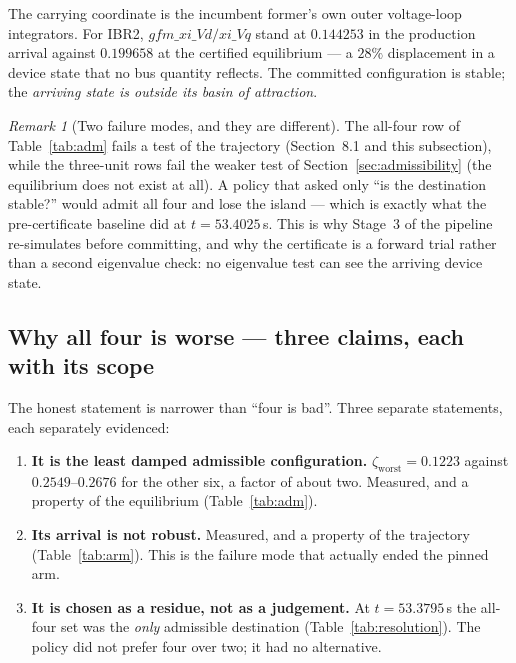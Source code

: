\documentclass[12pt,a4paper]{article}
\theoremstyle{remark}
\newtheorem{remark}{Remark}
\newcommand{\zworst}{\zeta_{\mathrm{worst}}}
\begin{document}
The carrying coordinate is the incumbent former's own outer voltage-loop
integrators. For IBR2, $gfm\_xi\_Vd/xi\_Vq$ stand at $0.144253$ in the production
arrival against $0.199658$ at the certified equilibrium --- a $28\%$ displacement
in a device state that no bus quantity reflects. The committed configuration is
stable; the \emph{arriving state is outside its basin of attraction}.

\begin{remark}[Two failure modes, and they are different]
The all-four row of Table~\ref{tab:adm} fails a test of the trajectory
(Section~8.1 and this subsection), while the three-unit rows fail the weaker test
of Section~\ref{sec:admissibility} (the equilibrium does not exist at all). A
policy that asked only ``is the destination stable?'' would admit all four and
lose the island --- which is exactly what the pre-certificate baseline did at
$t = 53.4025$\,s. This is why Stage~3 of the pipeline re-simulates before
committing, and why the certificate is a forward trial rather than a second
eigenvalue check: no eigenvalue test can see the arriving device state.
\end{remark}

\subsection{Why all four is worse --- three claims, each with its scope}

The honest statement is narrower than ``four is bad''. Three separate
statements, each separately evidenced:

\begin{enumerate}[leftmargin=1.7em,itemsep=3pt]
\item \textbf{It is the least damped admissible configuration.}
      $\zworst = 0.1223$ against $0.2549$--$0.2676$ for the other six, a factor
      of about two. Measured, and a property of the equilibrium
      (Table~\ref{tab:adm}).
\item \textbf{Its arrival is not robust.} Measured, and a property of the
      trajectory (Table~\ref{tab:arm}). This is the failure mode that actually
      ended the pinned arm.
\item \textbf{It is chosen as a residue, not as a judgement.} At
      $t = 53.3795$\,s the all-four set was the \emph{only} admissible
      destination (Table~\ref{tab:resolution}). The policy did not prefer four
      over two; it had no alternative.
\end{enumerate}
\end{document}
